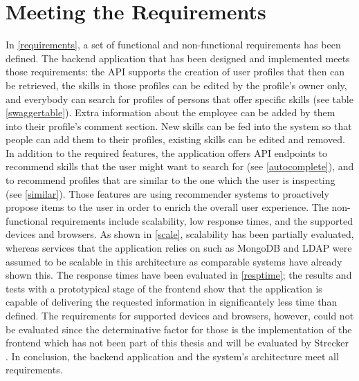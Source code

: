 \section{Meeting the Requirements}
In \ref{requirements}, a set of functional and non-functional requirements has been defined. The backend application that has been designed and implemented meets those requirements: the API supports the creation of user profiles that then can be retrieved, the skills in those profiles can be edited by the profile's owner only, and everybody can search for profiles of persons that offer specific skills (see table \ref{swaggertable}). Extra information about the employee can be added by them into their profile's comment section. New skills can be fed into the system so that people can add them to their profiles, existing skills can be edited and removed. In addition to the required features, the application offers API endpoints to recommend skills that the user might want to search for (see \ref{autocomplete}), and
to recommend profiles that are similar to the one which the user is inspecting (see \ref{similar}). Those features are using recommender systems to
proactively propose items to the user in order to enrich the overall user experience.\newline
The non-functional requirements include scalability, low response times, and the supported devices and browsers.
As shown in \ref{scale}, scalability has been partially evaluated, whereas services that the application relies on such as MongoDB and LDAP were assumed to be scalable in this architecture as comparable systems have already shown this. The response times have been evaluated in \ref{resptime}; the results and tests with a prototypical stage of the frontend show that the application is capable of delivering the requested information in significantely less time than defined.
The requirements for supported devices and browsers, however, could not be evaluated since the determinative factor for those is the implementation of the frontend which has not been part of this thesis and will be evaluated by Strecker \cite{strecker}. In conclusion, the backend application and the system's architecture meet all requirements.
